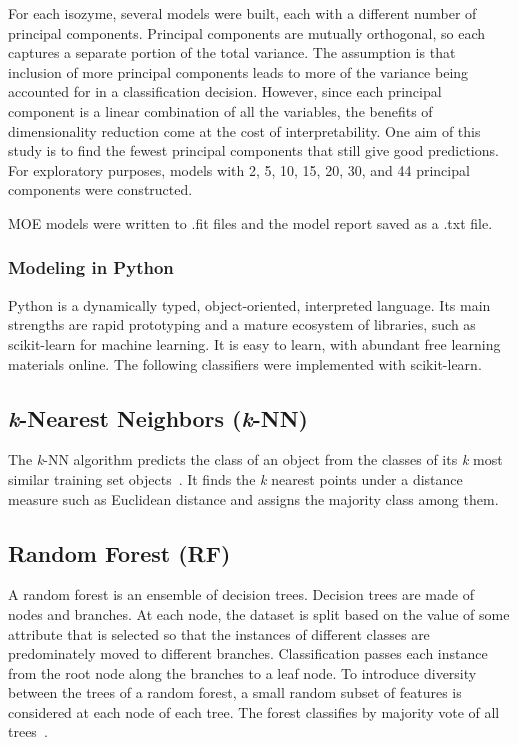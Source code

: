 For each isozyme, several models were built, each with a different number of principal components. Principal components are mutually orthogonal, so each captures a separate portion of the total variance. The assumption is that inclusion of more principal components leads to more of the variance being accounted for in a classification decision. However, since each principal component is a linear combination of all the variables, the benefits of dimensionality reduction come at the cost of interpretability. One aim of this study is to find the fewest principal components that still give good predictions.  For exploratory purposes, models with 2, 5, 10, 15, 20, 30, and 44 principal components were constructed. 

MOE models were written to .fit files and the model report saved as a .txt file.

\subsubsection{Modeling in Python}
Python is a dynamically typed, object-oriented, interpreted language. Its main strengths are rapid prototyping and a mature ecosystem of libraries, such as scikit-learn for machine learning. It is easy to learn, with abundant free learning materials online. The following classifiers were implemented with scikit-learn.

\subsection{\textit{k}-Nearest Neighbors (\textit{k}-NN)}
The \textit{k}-NN algorithm predicts the class of an object from the classes of its \textit{k} most similar training set objects~\cite{Lapins2013}. It finds the \textit{k} nearest points under a distance measure such as Euclidean distance and assigns the majority class among them.

\subsection{Random Forest (RF)}
A random forest is an ensemble of decision trees. Decision trees are made of nodes and branches. At each node, the dataset is split based on the value of some attribute that is selected so that the instances of different classes are predominately moved to different branches. Classification passes each instance from the root node along the branches to a leaf node. To introduce diversity between the trees of a random forest, a small random subset of features is considered at each node of each tree. The forest classifies by majority vote of all trees~\cite{Lapins2013}.

